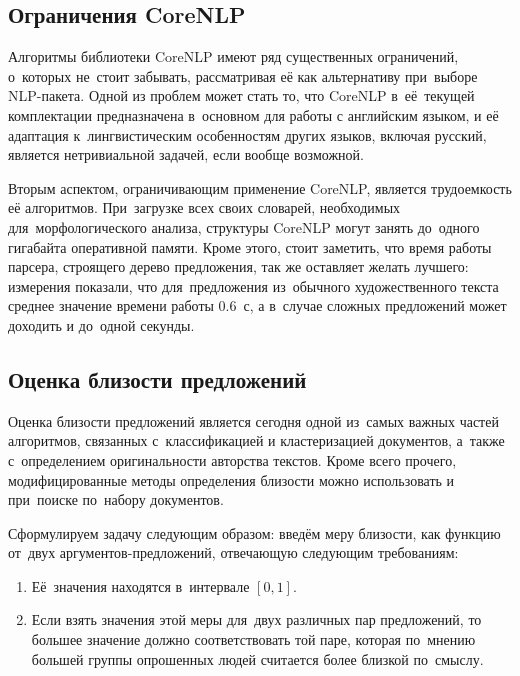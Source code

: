 \subsection{Ограничения CoreNLP}

Алгоритмы библиотеки CoreNLP имеют ряд существенных ограничений, о~которых не~стоит забывать, 
рассматривая её как альтернативу при~выборе NLP-пакета.
Одной из проблем может стать то, что CoreNLP в~её~текущей комплектации
предназначена в~основном для работы с английским языком, 
и её адаптация к~лингвистическим особенностям других языков, включая русский,
является нетривиальной задачей, если вообще возможной.

Вторым аспектом, ограничивающим применение CoreNLP, является трудоемкость её алгоритмов. 
При~загрузке всех своих словарей, необходимых для~морфологического анализа, 
структуры CoreNLP могут занять до~одного гигабайта оперативной памяти.
Кроме этого, стоит заметить, что время работы парсера, строящего дерево предложения,
так же оставляет желать лучшего: измерения показали, что для~предложения
из~обычного художественного текста среднее значение времени работы 0.6~с,
а в~случае сложных предложений может доходить и до~одной секунды.

\subsection{Оценка близости предложений}

Оценка близости предложений является сегодня одной из~самых важных частей алгоритмов,
 связанных с~классификацией и кластеризацией документов, %
а~также с~определением оригинальности авторства текстов. 
Кроме всего прочего, модифицированные методы определения близости можно использовать и при~поиске по~набору документов.

Сформулируем задачу следующим образом:
введём меру близости, как функцию от~двух аргументов-предложений, отвечающую следующим требованиям:

\begin{enumerate}

\item {
Её~значения находятся в~интервале $[0,1]$.
}

\item {
Если взять значения этой меры для~двух различных пар предложений, 
то большее значение должно соответствовать той паре, которая по~мнению большей группы опрошенных людей считается более близкой по~смыслу.
}

\end{enumerate}


